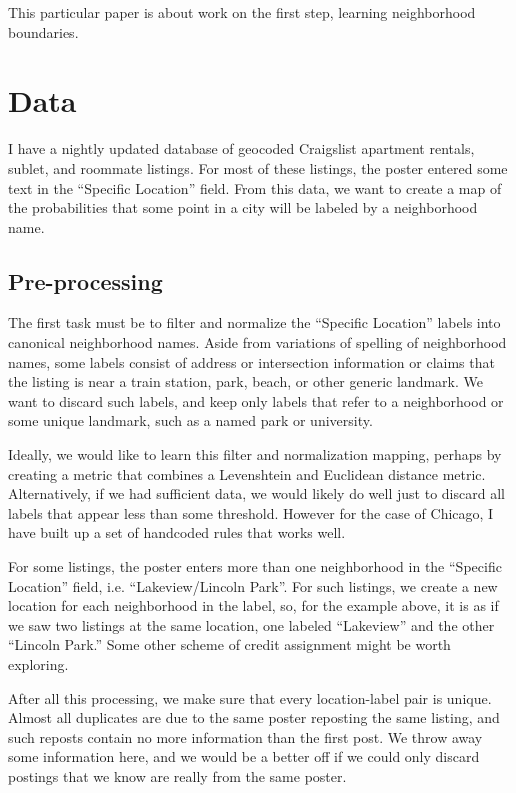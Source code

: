 \documentclass{article}
\begin{document}
This particular paper is about work on the first step, learning
neighborhood boundaries. 

\section{Data}
I have a nightly updated database of geocoded Craigslist apartment
rentals, sublet, and roommate listings. For most of these listings,
the poster entered some text in the ``Specific Location'' field. From
this data, we want to create a map of the probabilities that some
point in a city will be labeled by a neighborhood name.

\subsection{Pre-processing}
The first task must be to filter and normalize the ``Specific
Location'' labels into canonical neighborhood names. Aside from
variations of spelling of neighborhood names, some labels consist of
address or intersection information or claims that the listing is near
a train station, park, beach, or other generic landmark. We want to
discard such labels, and keep only labels that refer to a neighborhood
or some unique landmark, such as a named park or university.

Ideally, we would like to learn this filter and normalization mapping,
perhaps by creating a metric that combines a Levenshtein and Euclidean
distance metric. Alternatively, if we had sufficient data, we would
likely do well just to discard all labels that appear less than some
threshold. However for the case of Chicago, I have built up a set of
handcoded rules that works well.






For some listings, the poster enters more than one neighborhood in the
``Specific Location'' field, i.e. ``Lakeview/Lincoln Park''. For such
listings, we create a new location for each neighborhood in the label,
so, for the example above, it is as if we saw two listings at the same
location, one labeled ``Lakeview'' and the other ``Lincoln Park.''
Some other scheme of credit assignment might be worth exploring.

After all this processing, we make sure that every location-label pair
is unique. Almost all duplicates are due to the same poster reposting
the same listing, and such reposts contain no more information than
the first post. We throw away some information here, and we would be a
better off if we could only discard postings that we know are really
from the same poster.
\end{document}

